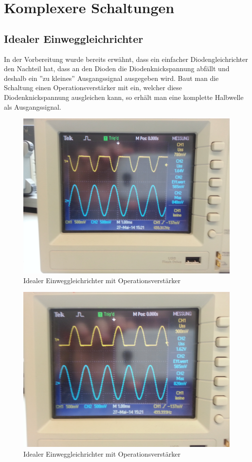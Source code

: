 \documentclass[a4paper,titlepage]{scrartcl}
\numberwithin{equation}{section}
\begin{document}
\section{Komplexere Schaltungen}
\subsection{Idealer Einweggleichrichter}

In der Vorbereitung wurde bereits erwähnt, dass ein einfacher Diodengleichrichter den Nachteil hat, dass an den Dioden die Diodenknickspannung abfällt und deshalb ein ''zu kleines'' Ausgangssignal ausgegeben wird. Baut man die Schaltung einen Operationsverstärker mit ein, welcher diese Diodenknickspannung ausgleichen kann, so erhält man eine komplette Halbwelle als Ausgangssignal.

\begin{figure}[H]
\centering
\includegraphics[scale=.08]{bilder/aufgabe_4_1_1.jpg} 
\caption{Idealer Einweggleichrichter mit Operationsverstärker}
\end{figure}

\begin{figure}[H]
\centering
\includegraphics[scale=.08]{bilder/aufgabe_4_1_2.jpg} 
\caption{Idealer Einweggleichrichter mit Operationsverstärker}
\end{figure}
\end{document}
